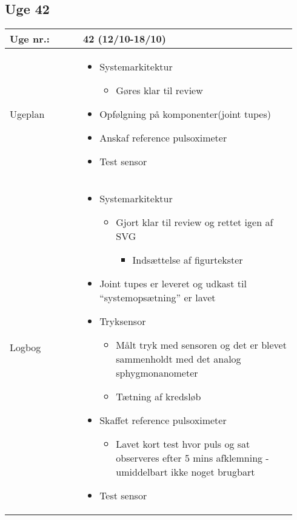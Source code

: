 	\subsection{Uge 42} \label{app:logUge42}
	\begin{longtable}{|p{0.24\linewidth}|p{0.7\linewidth}|}
		\hline
		Uge nr.: & 42 (12/10-18/10)\\ \hline
		Ugeplan & 
		\begin{itemize}
			\item Systemarkitektur 
			\begin{itemize}
				\item Gøres klar til review
			\end{itemize}
			\item Opfølgning på komponenter(joint tupes) 
			\item Anskaf reference pulsoximeter
			\item Test sensor
		\end{itemize}
		
		\\ \hline
		Logbog & 
		\begin{itemize}
			\item Systemarkitektur 
			\begin{itemize}
				\item Gjort klar til review og rettet igen af SVG
				\begin{itemize}
					\item Indsættelse af figurtekster 
				\end{itemize}
			\end{itemize}
			\item Joint tupes er leveret og udkast til “systemopsætning” er lavet
			\item Tryksensor
			\begin{itemize}
				\item Målt tryk med sensoren og det er blevet sammenholdt med det analog sphygmonanometer
				\item Tætning af kredsløb
			\end{itemize}
			\item Skaffet reference pulsoximeter
			\begin{itemize}
				\item Lavet kort test hvor puls og sat observeres efter 5 mins afklemning - umiddelbart ikke noget brugbart
			\end{itemize}
			\item Test sensor
		\end{itemize}
		\\ \hline
	\end{longtable}
	
